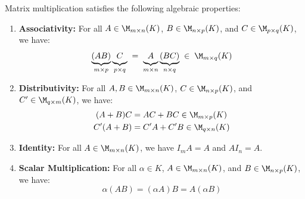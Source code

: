 \begin{proposition} 
\label{prop:matrix_multiplication_properties}
Matrix multiplication satisfies the following algebraic properties:
\begin{enumerate}[label=\textbf{(\alph*)}]
    \item \textbf{Associativity:} For all $A \in \M_{m \times n}(K)$, $B \in \M_{n \times p}(K)$, and $C \in \M_{p \times q}(K)$, we have:
    \begin{equation*}
        \underbrace{(AB)}_{m \times p} \underbrace{\vphantom{(}C}_{p \times q}
        \;=\; \underbrace{\vphantom{(}A}_{m \times n} \underbrace{(BC)}_{n \times q}
        \;\in\; \M_{m \times q}(K)
    \end{equation*}
    \item \textbf{Distributivity:} For all $A, B \in \M_{m \times n}(K)$, $C \in \M_{n \times p}(K)$, and $C' \in \M_{q \times m}(K)$, we have:
    \begin{align*}
        (A + B)C &= AC + BC \in \M_{m \times p}(K) \\
        C'(A + B) &= C'A + C'B \in \M_{q \times n}(K)
    \end{align*}
    \item \textbf{Identity:} For all $A \in \M_{m \times n}(K)$, we have $I_m A = A$ and $A I_n = A$.
    \item \textbf{Scalar Multiplication:} For all $\alpha \in K$, $A \in \M_{m \times n}(K)$, and $B \in \M_{n \times p}(K)$, we have:
    \begin{equation*}
        \alpha(AB) = (\alpha A)B = A(\alpha B)
    \end{equation*}
\end{enumerate}
\end{proposition}

